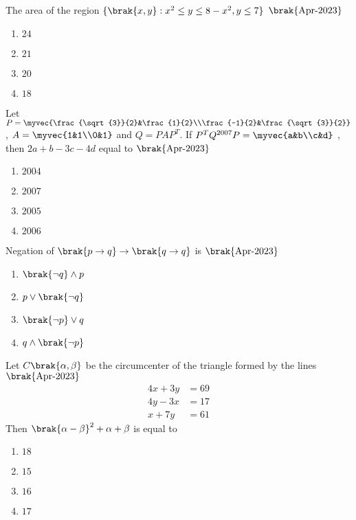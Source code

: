 \iffalse
\title{2023}
\author{EE24BTECH11006}
\section{mcq-single}
\fi

\item{
The area of the region $\{\brak{x,y}:x^2\leq y \leq 8-x^2,y \leq 7\}$
\hfill{$\brak{\text{Apr-2023}}$}
\begin{multicols}{4}
\begin{enumerate}
\item$24$
\item$21$
\item$20$
\item$18$
\end{enumerate}
\end{multicols}
}
\item{
Let $P=\myvec{\frac{\sqrt{3}}{2}&\frac{1}{2}\\\frac{-1}{2}&\frac{\sqrt{3}}{2}}$ , $A=\myvec{1&1\\0&1}$ and $Q=PAP^T$. If $P^TQ^{2007}P=\myvec{a&b\\c&d}$ , then $2a+b-3c-4d$ equal to
\hfill{$\brak{\text{Apr-2023}}$}
\begin{multicols}{4}
\begin{enumerate}
\item $2004$
\item $2007$
\item $2005$
\item $2006$
\end{enumerate}
\end{multicols}
}
\item{
Negation of $\brak{p\rightarrow q}\rightarrow\brak{q\rightarrow q}$ is 
\hfill{$\brak{\text{Apr-2023}}$}
\begin{multicols}{4}
\begin{enumerate}
\item $\brak{\neg q}\wedge p$
\item $p\vee\brak{\neg q}$
\item $\brak{\neg p}\vee q$
\item $q\wedge\brak{\neg p}$
\end{enumerate}
\end{multicols}
}
\item{
Let $C\brak{\alpha,\beta}$ be the circumcenter of the triangle formed by the lines\\
\hfill{$\brak{\text{Apr-2023}}$}
\begin{align*}
4x+3y&=69\\
4y-3x&=17\\
x+7y&=61
\end{align*}
Then $\brak{\alpha-\beta}^2+\alpha+\beta$ is equal to
\begin{multicols}{4}
\begin{enumerate}
\item $18$
\item $15$
\item $16$
\item $17$
\end{enumerate}
\end{multicols}
}
